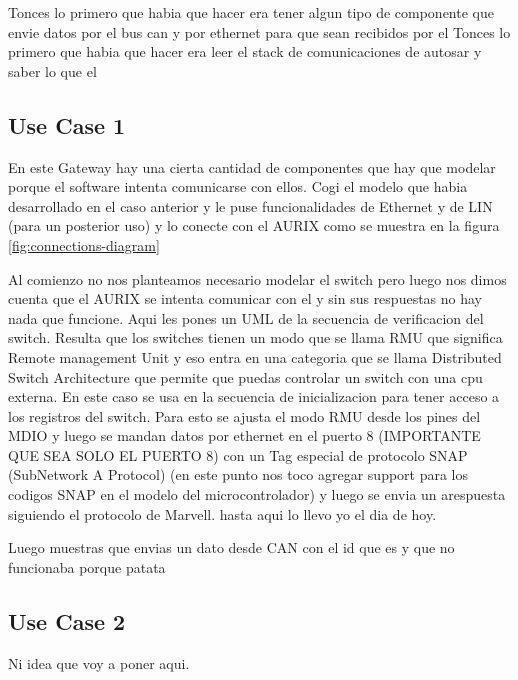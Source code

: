 Tonces lo primero que habia que hacer era tener algun tipo de componente que envie datos por el bus can y por ethernet para que sean recibidos por el 
Tonces lo primero que habia que hacer era leer el stack de comunicaciones de autosar y saber lo que el 
\subsection{Use Case 1}
En este Gateway hay una cierta cantidad de componentes que hay que modelar porque el software intenta comunicarse con ellos. Cogi el modelo que habia desarrollado en el caso anterior y le puse funcionalidades de Ethernet y de LIN (para un posterior uso) y lo conecte con el AURIX como se muestra en la figura \ref{fig:connections-diagram}


Al comienzo no nos planteamos necesario modelar el switch pero luego nos dimos cuenta que el AURIX se intenta comunicar con el y sin sus respuestas no hay nada que funcione. Aqui les pones un UML de la secuencia de verificacion del switch. Resulta que los switches tienen un modo que se llama RMU que significa Remote management Unit y eso entra en una categoria que se llama Distributed Switch Architecture que permite que puedas controlar un switch con una cpu externa. En este caso se usa en la secuencia de inicializacion para tener acceso a los registros del switch. Para esto se ajusta el modo RMU desde los pines del MDIO y luego se mandan datos por ethernet en el puerto 8 (IMPORTANTE QUE SEA SOLO EL PUERTO 8) con un Tag especial de protocolo SNAP (SubNetwork A Protocol) (en este punto nos toco agregar support para los codigos SNAP en el modelo del microcontrolador) y luego se envia un arespuesta siguiendo el protocolo de Marvell. hasta aqui lo llevo yo el dia de hoy.

Luego muestras que envias un dato desde CAN con el id que es y que no funcionaba porque patata

\subsection{Use Case 2}

Ni idea que voy a poner aqui.
